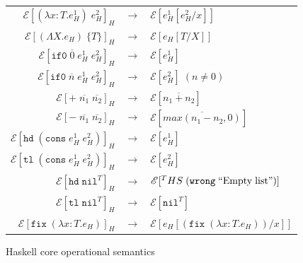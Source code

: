 \begin{figure}
\onehalfspacing
\begin{center}
\begin{tabular}{rcl}
$\mathscr{E}[(\lambda x:T.e_{H}^{1})\;e_{H}^{2}]_{H}$ & $\rightarrow$ & $\mathscr{E}[e_{H}^{1}[e_{H}^{2}/x]]$ \\
$\mathscr{E}[(\Lambda X.e_{H})\;\lbrace T\rbrace]_{H}$ & $\rightarrow$ & $\mathscr{E}[e_{H}[T/X]]$ \\
$\mathscr{E}[\mathtt{if0}\;\overline{0}\;e_{H}^{1}\;e_{H}^{2}]_{H}$ & $\rightarrow$ & $\mathscr{E}[e_{H}^{1}]$ \\
$\mathscr{E}[\mathtt{if0}\;\overline{n}\;e_{H}^{1}\;e_{H}^{2}]_{H}$ & $\rightarrow$ & $\mathscr{E}[e_{H}^{2}]\;(n\neq0)$ \\
$\mathscr{E}[+\;\overline{n_{1}}\;\overline{n_{2}}]_{H}$ & $\rightarrow$ & $\mathscr{E}[\overline{n_{1}+n_{2}}]$ \\
$\mathscr{E}[-\;\overline{n_{1}}\;\overline{n_{2}}]_{H}$ & $\rightarrow$ & $\mathscr{E}[\overline{max(n_{1}-n_{2},0)}]$ \\
$\mathscr{E}[\mathtt{hd}\;(\mathtt{cons}\;e_{H}^{1}\;e_{H}^{2})]_{H}$ & $\rightarrow$ & $\mathscr{E}[e_{H}^{1}]$ \\
$\mathscr{E}[\mathtt{tl}\;(\mathtt{cons}\;e_{H}^{1}\;e_{H}^{2})]_{H}$ & $\rightarrow$ & $\mathscr{E}[e_{H}^{2}]$ \\
$\mathscr{E}[\mathtt{hd}\;\mathtt{nil}^{T}]_{H}$ & $\rightarrow$ & $\mathscr{E}[^{T}HS\;(\mathtt{wrong}\;\mathrm{``Empty\;list"})]$ \\
$\mathscr{E}[\mathtt{tl}\;\mathtt{nil}^{T}]_{H}$ & $\rightarrow$ & $\mathscr{E}[\mathtt{nil}^{T}]$ \\
$\mathscr{E}[\mathtt{fix}\;(\lambda x:T.e_{H})]_{H}$ & $\rightarrow$ & $\mathscr{E}[e_{H}[(\mathtt{fix}\;(\lambda x:T.e_{H}))/x]]$
\end{tabular}
\end{center}
\caption{Haskell core operational semantics}
\label{fig:hcos}
\end{figure}
